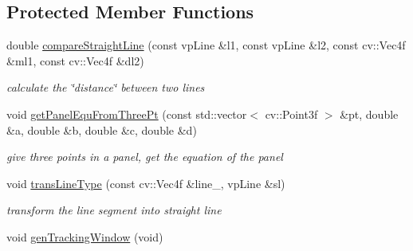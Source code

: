 \subsection*{\-Protected \-Member \-Functions}
\begin{DoxyCompactItemize}
\item 
double \hyperlink{classhoughLineBasedTracker_add007cef95a4327a9ab419e244fdce27}{compare\-Straight\-Line} (const vp\-Line \&l1, const vp\-Line \&l2, const cv\-::\-Vec4f \&ml1, const cv\-::\-Vec4f \&dl2)
\begin{DoxyCompactList}\small\item\em calculate the \char`\"{}distance\char`\"{} between two lines \end{DoxyCompactList}\item 
void \hyperlink{classhoughLineBasedTracker_a85f03d15859e655e0e5806af176e353d}{get\-Panel\-Equ\-From\-Three\-Pt} (const std\-::vector$<$ cv\-::\-Point3f $>$ \&pt, double \&a, double \&b, double \&c, double \&d)
\begin{DoxyCompactList}\small\item\em give three points in a panel, get the equation of the panel \end{DoxyCompactList}\item 
void \hyperlink{classhoughLineBasedTracker_acbda1d791078dc58527bfe4d7693908c}{trans\-Line\-Type} (const cv\-::\-Vec4f \&line\-\_\-, vp\-Line \&sl)
\begin{DoxyCompactList}\small\item\em transform the line segment into straight line \end{DoxyCompactList}\item 
\hypertarget{classhoughLineBasedTracker_ae5e79ae2fc221b2b591d90f2c334f7c3}{void \hyperlink{classhoughLineBasedTracker_ae5e79ae2fc221b2b591d90f2c334f7c3}{gen\-Tracking\-Window} (void)}\label{classhoughLineBasedTracker_ae5e79ae2fc221b2b591d90f2c334f7c3}


\end{DoxyCompactItemize}
